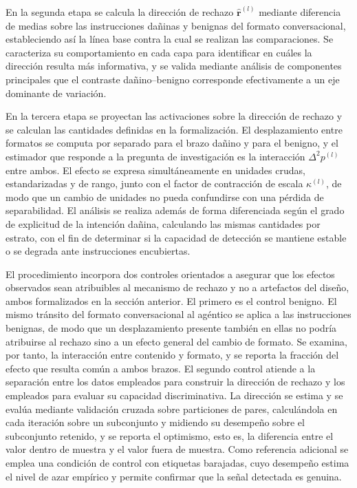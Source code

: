 \documentclass[12pt,a4paper]{article}
\begin{document}
En la segunda etapa se calcula la dirección de rechazo $\hat{\bm{r}}^{(l)}$ mediante diferencia de medias sobre las instrucciones dañinas y benignas del formato conversacional, estableciendo así la línea base contra la cual se realizan las comparaciones. Se caracteriza su comportamiento en cada capa para identificar en cuáles la dirección resulta más informativa, y se valida mediante análisis de componentes principales que el contraste dañino--benigno corresponde efectivamente a un eje dominante de variación.

En la tercera etapa se proyectan las activaciones sobre la dirección de rechazo y se calculan las cantidades definidas en la formalización. El desplazamiento entre formatos se computa por separado para el brazo dañino y para el benigno, y el estimador que responde a la pregunta de investigación es la interacción $\Delta^{2} p^{(l)}$ entre ambos. El efecto se expresa simultáneamente en unidades crudas, estandarizadas y de rango, junto con el factor de contracción de escala $\kappa^{(l)}$, de modo que un cambio de unidades no pueda confundirse con una pérdida de separabilidad. El análisis se realiza además de forma diferenciada según el grado de explicitud de la intención dañina, calculando las mismas cantidades por estrato, con el fin de determinar si la capacidad de detección se mantiene estable o se degrada ante instrucciones encubiertas.

El procedimiento incorpora dos controles orientados a asegurar que los efectos observados sean atribuibles al mecanismo de rechazo y no a artefactos del diseño, ambos formalizados en la sección anterior. El primero es el control benigno. El mismo tránsito del formato conversacional al agéntico se aplica a las instrucciones benignas, de modo que un desplazamiento presente también en ellas no podría atribuirse al rechazo sino a un efecto general del cambio de formato. Se examina, por tanto, la interacción entre contenido y formato, y se reporta la fracción del efecto que resulta común a ambos brazos. El segundo control atiende a la separación entre los datos empleados para construir la dirección de rechazo y los empleados para evaluar su capacidad discriminativa. La dirección se estima y se evalúa mediante validación cruzada sobre particiones de pares, calculándola en cada iteración sobre un subconjunto y midiendo su desempeño sobre el subconjunto retenido, y se reporta el optimismo, esto es, la diferencia entre el valor dentro de muestra y el valor fuera de muestra. Como referencia adicional se emplea una condición de control con etiquetas barajadas, cuyo desempeño estima el nivel de azar empírico y permite confirmar que la señal detectada es genuina.
\end{document}
